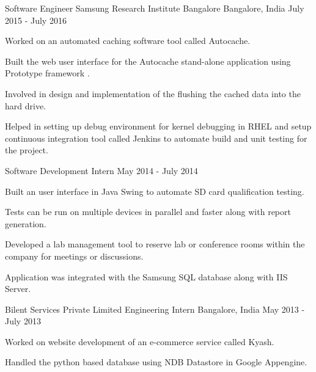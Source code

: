 \begin{cventries}
  \cventry
    {Software Engineer}
    {Samsung Research Institute Bangalore}
    {Bangalore, India}
    {July 2015 - July 2016}
    {
      \begin{cvitems}
        \item {Worked on an automated caching software tool called Autocache.}
        \item {Built the web user interface for the Autocache stand-alone application using Prototype framework .}
        \item {Involved in design and implementation of the flushing the cached data into the hard drive.}
        \item{Helped in setting up debug environment for kernel debugging in RHEL and setup continuous integration tool called Jenkins to automate build and unit testing for the project.}        
      \end{cvitems}
    }      
  \cventry
    {Software Development Intern}
    {}
    {}
    {May 2014 - July 2014}
    {
      \begin{cvitems}
        \item {Built an user interface in Java Swing to automate SD card qualification testing.}
        \item{Tests can be run on multiple devices in parallel and faster along with report generation.}
        \item {Developed a lab management tool to reserve lab or conference rooms within the company for meetings or discussions.}
        \item{Application was integrated with the Samsung SQL database along with IIS Server.}
      \end{cvitems}
    }
    
    \cventry
    {Bilent Services Private Limited}
    {Engineering Intern}
    {Bangalore, India}
    {May 2013 - July 2013}
    {
      \begin{cvitems}
        \item{Worked on website development of an e-commerce service called Kyash.}
        \item {Handled the python based database using NDB Datastore in Google Appengine.}
      \end{cvitems}
    }
\end{cventries}
\vspace{-0.2cm} 
